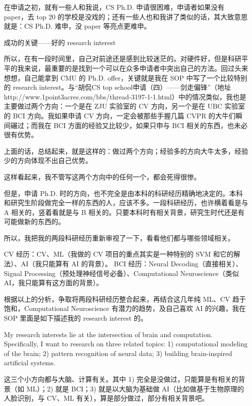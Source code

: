 \documentclass[11pt,fleqn,openany]{book} %
\begin{document}
在申请之初，就有一些人和我说，CS Ph.D. 申请很困难，申请者如果没有 paper，去 top 20 的学校是没戏的；还有一些人也和我讲了类似的话，其大致意思就是：CS Ph.D. 难申，没 paper 等亮点更难申。

成功的关键——好的 research interest

所以，在有一段时间里，自己对前途还是感到比较迷茫的。对硬件好，但是科研平平的我来说，最重要的是找到一个可以在众多申请者中突出自己的方法。回过头来想想，自己能拿到 CMU 的 Ph.D. offer，关键就是我在 SOP 中写了一个比较特别的 research interest。与“胡侃CS top school申请（四）——剑走偏锋”（地址 http://www.1point3acres.com/bbs/thread-3197-1-1.html）中的情况类似，我也是主要做过两个方向：一个是在 ZJU 实验室的 CV 方向，另一个是在 UBC 实验室的 BCI 方向。我如果申请 CV 方向，一定会被那些手握几篇 CVPR 的大牛们瞬间碾过；而我在 BCI 方面的经验又比较少，如果只申与 BCI 相关的东西，也未必很有优势。

上面的话，总结起来，就是这样的：做过两个方向；经验多的方向大牛太多，经验少的方向体现不出自己优势。

这样看起来，我不管写这两个方向中的任何一个，都会死得很惨。

但是，申请 Ph.D. 时的方向，也不完全是由本科的科研经历精确地决定的。本科和研究生阶段做完全一样的东西的人，应该不多。一段科研经历，也许横着看是与 A 相关的，竖着看就是与 B 相关的。只要本科时有相关背景，研究生时代还是有可能做新的东西的。

所以，我把我的两段科研经历重新审视了一下，看看他们都与哪些领域相关。

CV 经历：CV、ML（我做的 CV 项目的重点其实是一种特别的 SVM 和它的解法）、AI（我只能算有 AI 的背景）。
BCI 经历：Neural Decoding（直接相关）、Signal Processing（预处理神经信号必备）、Computational Neuroscience（类似 AI，我只能算有这方面的背景）。

根据以上的分析，争取将两段科研经历整合起来，再结合这几年纯 ML、CV 趋于饱和，Computational Neuroscience 有潜力的趋势，及自己喜欢 AI 的兴趣，我在 SOP 里面是如下描述我的 research interest 的。

My research interests lie at the intersection of brain and computation. Specifically, I want to research on three related topics: 1) computational modeling of the brain; 2) pattern recognition of neural data; 3) building brain-inspired artificial systems.

这三个小方向都与大脑、计算有关。其中 1) 完全是没做过，只能算是有相关的背景（如 ML）；2) 就是 BCI；3) 就是以大脑为基础做 AI（比如做基于生物原理的人脸识别，与 CV、ML 有关），算是部分做过，部分有相关背景吧。
\end{document}
